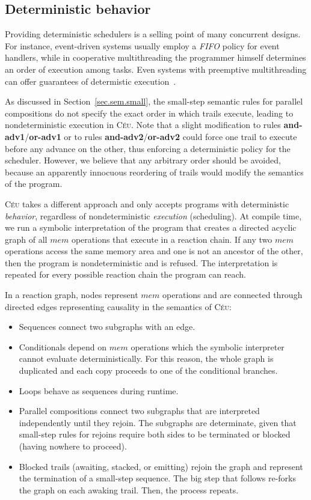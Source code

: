 \documentclass[preprint]{sigplanconf}
\newcommand{\CEU}{\textsc{C\'{e}u}\xspace}
\newcommand{\1}{\;}
\newcommand{\2}{\;\;}
\newcommand{\3}{\;\;\;}
\newcommand{\5}{\;\;\;\;\;}
\begin{document}
\subsection{Deterministic behavior}
\label{sec.safety.det}

Providing deterministic schedulers is a selling point of many concurrent 
designs.
For instance, event-driven systems usually employ a \emph{FIFO} policy for 
event handlers, while in cooperative multithreading the programmer himself 
determines an order of execution among tasks.
Even systems with preemptive multithreading can offer guarantees of determistic 
execution~\cite{async.kendo}.

As discussed in Section~\ref{sec.sem.small}, the small-step semantic rules for 
parallel compositions do not specify the exact order in which trails execute, 
leading to nondeterministic execution in \CEU.
Note that a slight modification to rules \textbf{and-adv1}/\textbf{or-adv1} or 
to rules \textbf{and-adv2}/\textbf{or-adv2} could force one trail to execute 
before any advance on the other, thus enforcing a deterministic policy for the 
scheduler.
However, we believe that any arbitrary order should be avoided, because an 
apparently innocuous reordering of trails would modify the semantics of the 
program.

\CEU takes a different approach and only accepts programs with deterministic 
\emph{behavior}, regardless of nondeterministic \emph{execution} (scheduling).
At compile time, we run a symbolic interpretation of the program that creates a 
directed acyclic graph of all $mem$ operations that execute in a reaction 
chain.
If any two $mem$ operations access the same memory area and one is not an 
ancestor of the other, then the program is nondeterministic and is refused.
The interpretation is repeated for every possible reaction chain the program 
can reach.

In a reaction graph, nodes represent $mem$ operations and are connected through 
directed edges representing causality in the semantics of \CEU:

\begin{itemize}
\item Sequences connect two subgraphs with an edge.
\item Conditionals depend on $mem$ operations which the symbolic interpreter 
cannot evaluate deterministically.
For this reason, the whole graph is duplicated and each copy proceeds to one of 
the conditional branches.
\item Loops behave as sequences during runtime.
\item Parallel compositions connect two subgraphs that are interpreted 
independently until they rejoin.
The subgraphs are determinate, given that small-step rules for rejoins require 
both sides to be terminated or blocked (having nowhere to proceed).
\item Blocked trails (awaiting, stacked, or emitting) rejoin the graph and 
represent the termination of a small-step sequence.
The big step that follows re-forks the graph on each awaking trail.
Then, the process repeats.
\end{itemize}
\end{document}
